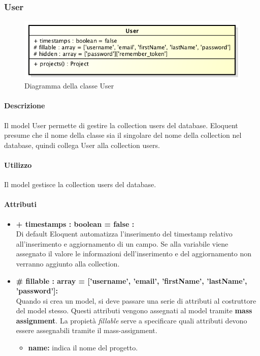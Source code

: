 \subsubsection{User}

	\begin{figure}[h]
		\centering
		\includegraphics[width=0.5\linewidth]{img/User}
		\caption[Diagramma della classe User]{Diagramma della classe User}
	\end{figure}

	\paragraph{Descrizione}
	Il model User permette di gestire la collection users del database. Eloquent presume che il nome della classe sia il singolare del nome della collection nel database, quindi collega User alla collection users.

	\paragraph{Utilizzo}
	Il model gestisce la collection users del database.
	
	\paragraph{Attributi}
	\begin{itemize}
		\item \textbf{+ timestamps : boolean = false :}\\
		Di default Eloquent automatizza l'inserimento del timestamp relativo all'inserimento e aggiornamento di un campo. Se alla variabile viene assegnato il valore le informazioni dell'inserimento e del aggiornamento non verranno aggiunto alla collection.
		\item \textbf{\# fillable : array = ['username', 'email', 'firstName', 'lastName', 'password']:}\\
		Quando si crea un model, si deve passare una serie di attributi al costruttore del model stesso. Questi attributi vengono assegnati al model tramite \textbf{mass assignment}. La propietà \textit{fillable} serve a specificare quali attributi devono essere assegnabili tramite il mass-assignment.
		\begin{itemize}
			\item \textbf{name:} indica il nome del progetto.
		\end{itemize}
	\end{itemize}
	
